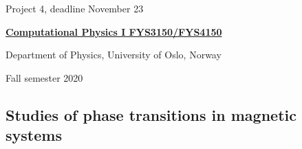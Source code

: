 \documentclass[%
oneside,                 %
final,                   %
10pt]{article}
\begin{document}

\newcommand{\exercisesection}[1]{\subsection*{#1}}






\thispagestyle{empty}

\begin{center}
{\LARGE\bf
\begin{spacing}{1.25}
Project 4, deadline  November 23
\end{spacing}
}
\end{center}


\begin{center}
{\bf \href{{http://www.uio.no/studier/emner/matnat/fys/FYS3150/index-eng.html}}{Computational Physics I FYS3150/FYS4150}}
\end{center}

    \begin{center}
\centerline{{\small Department of Physics, University of Oslo, Norway}}
\end{center}
    

\begin{center}
Fall semester 2020
\end{center}

\vspace{1cm}


\subsection{Studies of phase transitions in magnetic systems}
\end{document}
